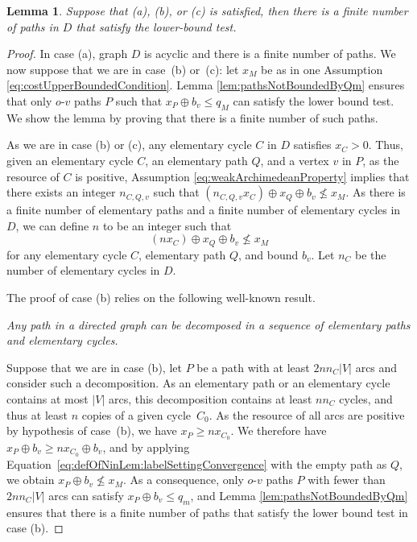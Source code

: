 \documentclass[11pt]{amsart}
\theoremstyle{plain}
\newtheorem{lem}[theo]{Lemma}
\theoremstyle{remark}
\newcommand{\rplus}{\oplus}
\newcommand{\rleq}{\leqslant}
\newcommand{\rgeq}{\geqslant}
\newcommand{\nrleq}{\nleqslant}
\newcommand{\re}{x}
\begin{document}
\begin{lem}\label{lem:labelSettingConvergence}
Suppose that \emph{(a)}, \emph{(b)}, or \emph{(c)} is satisfied, then there is a finite number of paths in $D$ that satisfy the lower-bound test.
\end{lem}
\begin{proof}
In case (a), graph $D$ is acyclic and there is a finite number of paths. We now suppose that we are in case~(b) or~(c): let $\re_{M}$ be as in one Assumption \eqref{eq:costUpperBoundedCondition}. Lemma \ref{lem:pathsNotBoundedByQm} ensures that only $o$-$v$ paths $P$ such that $\re_{P} \rplus b_{v} \rleq q_{M}$ can satisfy the lower bound test. We show the lemma by proving that there is a finite number of such paths.
 
As we are in case (b) or (c), any elementary cycle $C$ in $D$ satisfies $\re_{C} > 0$. Thus, given an elementary cycle $C$, an elementary path $Q$, and a vertex $v$ in $P$, as the resource of $C$ is positive, Assumption \eqref{eq:weakArchimedeanProperty} implies that there exists an integer $n_{C,Q,v}$ such that $(n_{C,Q,v} \re_{C}) \rplus \re_{Q} \rplus b_{v} \nrleq \re_{M}$. As there is a finite number of elementary paths and a finite number of elementary cycles in $D$, we can define $n$ to be an integer such that
\begin{equation}\label{eq:defOfNinLem:labelSettingConvergence}
	(n \re_{C}) \rplus \re_{Q} \rplus b_{v} \nrleq \re_{M}
\end{equation}
for any elementary cycle $C$, elementary path $Q$, and bound $b_{v}$. Let $n_{C}$ be the number of elementary cycles in $D$.


The proof of case (b) relies on the following well-known result. 

{\em Any path in a directed graph can be decomposed in a sequence of elementary paths and elementary cycles.}

Suppose that we are in case (b), let $P$ be a path with at least $2 nn_{C}|V|$ arcs and consider such a decomposition. As an elementary path or an elementary cycle contains at most $|V|$ arcs, this decomposition contains at least $nn_{C}$ cycles, and thus at least $n$ copies of a given cycle~$C_{0}$. As the resource of all arcs are positive by hypothesis of case~(b), we have $\re_{P} \rgeq n\re_{C_{0}}$. We therefore have $\re_{P} \rplus b_{v} \rgeq n\re_{C_{0}} \rplus b_{v}$, and by applying Equation~\eqref{eq:defOfNinLem:labelSettingConvergence} with the empty path as $Q$, we obtain $\re_{P} \rplus b_{v} \nrleq \re_{M}$. As a consequence, only $o$-$v$ paths $P$ with fewer than $2nn_{C}|V|$ arcs can satisfy $\re_{P} \rplus b_{v} \rleq q_{m}$, and Lemma \ref{lem:pathsNotBoundedByQm} ensures that there is a finite number of paths that satisfy the lower bound test in case (b). 
 

\end{proof}
\end{document}
